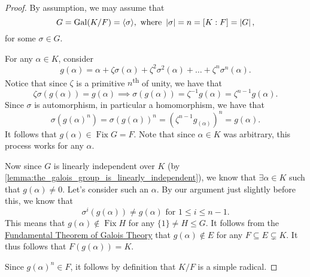 \documentclass[notoc,notitlepage,nobib]{tufte-book}
\DeclareMathOperator{\Gal}{Gal}
\DeclareMathOperator{\Fix}{Fix}
\begin{document}
\begin{proof}
  By assumption, we may assume that
  \begin{equation*}
    G = \Gal(K / F) = \langle \sigma \rangle, \text{ where } \abs{\sigma} = n =
    [K : F] = \abs{G},
  \end{equation*}
  for some $\sigma \in G$.

  \noindent

  \faLightbulb For any $\alpha \in K$, consider
  \begin{equation*}
    g(\alpha) = \alpha + \zeta\sigma(\alpha) + \zeta^2\sigma^2(\alpha) + \hdots
    + \zeta^n\sigma^n(\alpha).
  \end{equation*}
  \faLightbulb Notice that since $\zeta$ is a primitive $n$\textsuperscript{th}
  of unity, we have that
  \begin{equation*}
    \zeta\sigma(g(\alpha)) = g(\alpha) \implies \sigma(g(\alpha)) = \zeta^{-1}
    g(\alpha) = \zeta^{n-1} g(\alpha).
  \end{equation*}
  Since $\sigma$ is automorphism, in particular a homomorphism, we have that
  \begin{equation*}
    \sigma(g(\alpha)^n) = \sigma(g(\alpha))^n = (\zeta^{n-1} g_(\alpha))^n =
    g(\alpha).
  \end{equation*}
  It follows that $g(\alpha) \in \Fix G = F$. Note that since $\alpha \in K$ was
  arbitrary, this process works for any $\alpha$.

  \noindent

  Now since $G$ is linearly independent over $K$ (by
  \cref{lemma:the_galois_group_is_linearly_independent}), we know that $\exists
  \alpha \in K$ such that $g(\alpha) \neq 0$. Let's consider such an $\alpha$.
  By our argument just slightly before this, we know that
  \begin{equation*}
    \sigma^i(g(\alpha)) \neq g(\alpha) \text{ for } 1 \leq i \leq n - 1.
  \end{equation*}
  This means that $g(\alpha) \notin \Fix H$ for any $\{1\} \neq H \leq G$. It
  follows from the
  \hyperref[thm:fundamental_theorem_of_galois_theory]{Fundamental Theorem of
  Galois Theory} that $g(\alpha) \notin E$ for any $F \subseteq E \subsetneq K$.
  It thus follows that $F(g(\alpha)) = K$.

  Since $g(\alpha)^n \in F$, it follows by definition that $K / F$ is a simple
  radical.
\end{proof}
\end{document}
